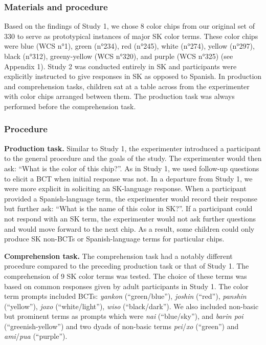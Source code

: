 \documentclass[
  english,
  ,man,floatsintext]{apa6}
\begin{document}
\hypertarget{materials-and-procedure-1}{%
\subsubsection{Materials and procedure}\label{materials-and-procedure-1}}

Based on the findings of Study 1, we chose 8 color chips from our original set of 330 to serve as prototypical instances of major SK color terms. These color chips were blue (WCS n°1), green (n°234), red (n°245), white (n°274), yellow (n°297), black (n°312), greeny-yellow (WCS n°320), and purple (WCS n°325) (see Appendix 1). Study 2 was conducted entirely in SK and participants were explicitly instructed to give responses in SK as opposed to Spanish. In production and comprehension tasks, children sat at a table across from the experimenter with color chips arranged between them. The production task was always performed before the comprehension task.

\hypertarget{procedure}{%
\subsubsection{Procedure}\label{procedure}}

\textbf{Production task.} Similar to Study 1, the experimenter introduced a participant to the general procedure and the goals of the study. The experimenter would then ask: \enquote{What is the color of this chip?}. As in Study 1, we used follow-up questions to elicit a BCT when initial response was not. In a departure from Study 1, we were more explicit in soliciting an SK-language response. When a participant provided a Spanish-language term, the experimenter would record their response but further ask: \enquote{What is the name of this color in SK?}. If a participant could not respond with an SK term, the experimenter would not ask further questions and would move forward to the next chip. As a result, some children could only produce SK non-BCTs or Spanish-language terms for particular chips.

\textbf{Comprehension task.} The comprehension task had a notably different procedure compared to the preceding production task or that of Study 1. The comprehension of 9 SK color terms was tested. The choice of these terms was based on common responses given by adult participants in Study 1. The color term prompts included BCTs: \emph{yankon} (\enquote{green/blue}), \emph{joshin} (\enquote{red}), \emph{panshin} (\enquote{yellow}), \emph{joxo} (\enquote{white/light}), \emph{wiso} (\enquote{black/dark}). We also included non-basic but prominent terms as prompts which were \emph{nai} (\enquote{blue/sky}), and \emph{barin poi} (\enquote{greenish-yellow}) and two dyads of non-basic terms \emph{pei}/\emph{xo} (\enquote{green}) and \emph{ami}/\emph{pua} (\enquote{purple}).
\end{document}

